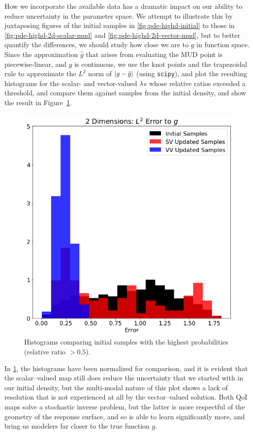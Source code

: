 How we incorporate the available data has a dramatic impact on our ability to reduce uncertainty in the parameter space.
We attempt to illustrate this by juxtaposing figures of the initial samples in \ref{fig:pde-highd-initial} to those in \ref{fig:pde-highd-2d-scalar-mud} and \ref{fig:pde-highd-2d-vector-mud}, but to better quantify the differences, we should study how close we are to $g$ in function space.
Since the approximation $\hat{g}$ that arises from evaluating the MUD point is piecewise-linear, and $g$ is continuous, we use the knot points and the trapezoidal rule to approximate the $L^2$ norm of $\left\vert g - \hat{g}\right\vert$ (using {\tt scipy}), and plot the resulting histograms for the scalar- and vector-valued $\lambda$s whose relative ratios exceeded a threshold, and compare them against samples from the initial density, and show the result in Figure~\ref{fig:pde-highd-2d-hist}.


\begin{figure}[htbp]
\centering
  \includegraphics[width=0.675\linewidth]{figures/pde-highd/pde-highd_hist_D2_t5-0E-01}
\caption{
Histograms comparing initial samples with the highest probabilities (relative ratio $> 0.5$).
}
\label{fig:pde-highd-2d-hist}
\end{figure}

In \ref{fig:pde-highd-2d-hist}, the histograms have been normalized for comparison, and it is evident that the scalar--valued map still does reduce the uncertainty that we started with in our initial density, but the multi-modal nature of this plot shows a lack of resolution that is not experienced at all by the vector--valued solution.
Both QoI maps solve a stochastic inverse problem, but the latter is more respectful of the geometry of the response surface, and so is able to learn significantly more, and bring us modelers far closer to the true function $g$.

